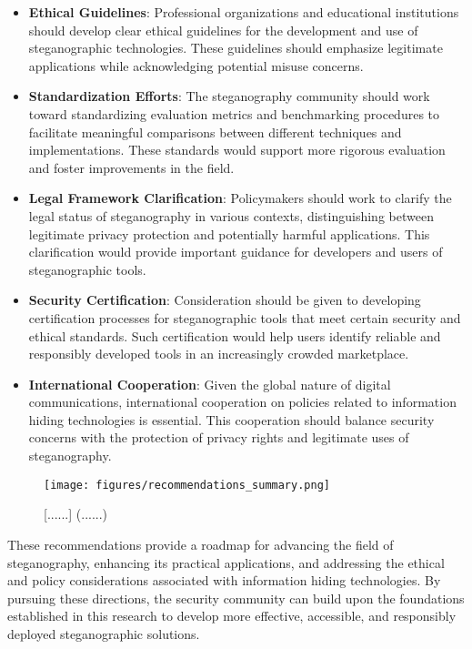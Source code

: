 \documentclass[12pt, a4paper, oneside]{book}
\begin{document}
\begin{itemize}[leftmargin=*]
    \item \textbf{Ethical Guidelines}: Professional organizations and educational institutions should develop clear ethical guidelines for the development and use of steganographic technologies. These guidelines should emphasize legitimate applications while acknowledging potential misuse concerns.

    \item \textbf{Standardization Efforts}: The steganography community should work toward standardizing evaluation metrics and benchmarking procedures to facilitate meaningful comparisons between different techniques and implementations. These standards would support more rigorous evaluation and foster improvements in the field.

    \item \textbf{Legal Framework Clarification}: Policymakers should work to clarify the legal status of steganography in various contexts, distinguishing between legitimate privacy protection and potentially harmful applications. This clarification would provide important guidance for developers and users of steganographic tools.

    \item \textbf{Security Certification}: Consideration should be given to developing certification processes for steganographic tools that meet certain security and ethical standards. Such certification would help users identify reliable and responsibly developed tools in an increasingly crowded marketplace.

    \item \textbf{International Cooperation}: Given the global nature of digital communications, international cooperation on policies related to information hiding technologies is essential. This cooperation should balance security concerns with the protection of privacy rights and legitimate uses of steganography.
\end{itemize}

\begin{figure}[htbp]
    \centering
    \texttt{[image: figures/recommendations\_summary.png]}
    \caption{[......] (......)}
    \label{fig:recommendations}
\end{figure}

These recommendations provide a roadmap for advancing the field of steganography, enhancing its practical applications, and addressing the ethical and policy considerations associated with information hiding technologies. By pursuing these directions, the security community can build upon the foundations established in this research to develop more effective, accessible, and responsibly deployed steganographic solutions.
\end{document}
